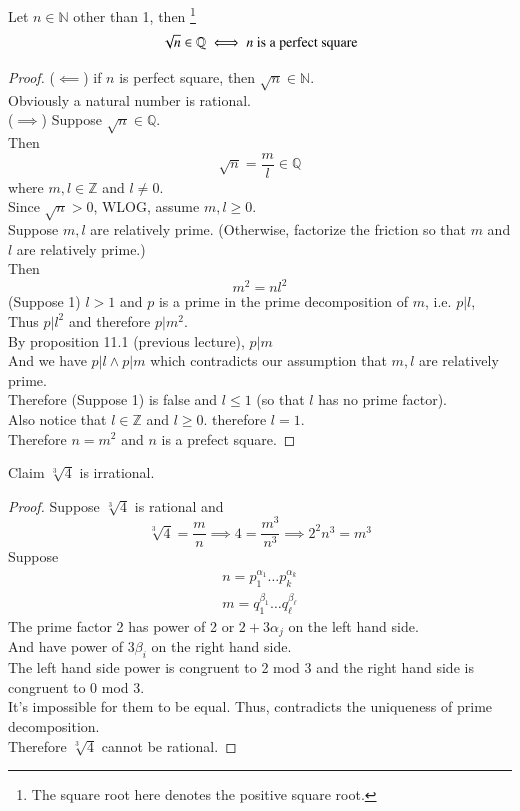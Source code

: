 \documentclass[10pt]{article}
\begin{document}
	\begin{theorem}[Generalization]
		Let $n \in \mathbb{N}$ other than 1, then \footnote{The square root here denotes the positive square root.}
		\[
			\sqrt{n} \in \mathbb{Q} \iff n \text{{ is a perfect square}}
		\]
	\end{theorem}
	\begin{proof}
		($\impliedby$) if $n$ is perfect square, then $\sqrt{n} \in \mathbb{N}$. \\
		Obviously a natural number is rational. \\
		($\implies$) Suppose $\sqrt{n} \in \mathbb{Q}$. \\
		Then 
		\[
			\sqrt{n} = \frac{m}{l} \in \mathbb{Q}
		\]where $m, l \in \mathbb{Z}$ and $l \neq 0$. \\
		Since $\sqrt{n} > 0$, WLOG, assume $m, l \geq 0$. \\
		Suppose $m, l$ are relatively prime. (Otherwise, factorize the friction so that $m$ and $l$ are relatively prime.)\\
		Then 
		\[
			m^2 = n l^2
		\]
		(Suppose 1) $l > 1 $ and $p$ is a prime in the prime decomposition of $m$, i.e. $p | l$, \\
		Thus $p | l^2$ and therefore $p | m^2$. \\
		By proposition 11.1 (previous lecture), $p | m$ \\
		And we have $p | l \land p | m$ which contradicts our assumption that $m, l$ are relatively prime. \\
		Therefore (Suppose 1) is false and $l \leq 1$ (so that $l$ has no prime factor). \\
		Also notice that $l \in \mathbb{Z}$ and $l \geq 0$. therefore $l = 1$. \\
		Therefore $n = m^2$ and $n$ is a prefect square.
	\end{proof}
	
	\begin{example}
		Claim $\sqrt[3]{4}$ is irrational.
	\end{example}
	\begin{proof}
		Suppose $\sqrt[3]{4}$ is rational and 
		\[
			\sqrt[3]{4} = \frac{m}{n} \implies 4 = \frac{m^3}{n^3} \implies 2^2 n^3 = m^3
		\]
		Suppose 
		\begin{gather*}
			n = p_1^{\alpha_1} \dots p_k^{\alpha_k} \\
			m = q_1^{\beta_1} \dots q_\ell^{\beta_{\ell}}
		\end{gather*}
		The prime factor 2 has power of 2 or $2 + 3\alpha_j$ on the left hand side. \\
		And have power of $3\beta_i$ on the right hand side. \\
		The left hand side power is congruent to 2 mod 3 and the right hand side is congruent to 0 mod 3. \\
		It's impossible for them to be equal. Thus, contradicts the uniqueness of prime decomposition. \\
		Therefore $\sqrt[3]{4}$ cannot be rational.
	\end{proof}
	
\end{document}
